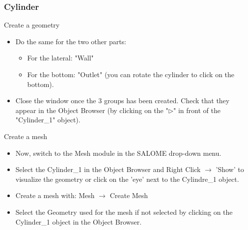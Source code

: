 \documentclass[10pt, hyperref={unicode=true,pdfusetitle, bookmarks=true,bookmarksnumbered=false,bookmarksopen=false, breaklinks=false,pdfborder={0 0l 1},backref=true,colorlinks=true,linkcolor=darkblue,pageanchor}]{beamer}
\begin{document}
\begin{frame}
\frametitle{Cylinder}

\begin{block}{Create a geometry}
\begin{itemize}
\item Do the same for the two other parts:
    \begin{itemize}
    \item [$\circ$] For the lateral: "Wall"
    \item [$\circ$] For the bottom: "Outlet" (you can rotate the cylinder to click on the bottom).
    \end{itemize}
\item Close the window once the 3 groups has been created. Check that they appear in the Object Browser (by clicking on the "$\triangleright$" in front of the "Cylinder\_1" object).
\end{itemize}
\end{block}

\begin{block}{Create a mesh}
\begin{itemize}
\item \label{salome_mesh} Now, switch to the Mesh module in the SALOME drop-down menu.
\item Select the Cylinder\_1 in the Object Browser and Right Click $\rightarrow$ 'Show' to visualize the geometry or click on the 'eye' next to the Cylindre\_1 object.
\item Create a mesh with: Mesh $\rightarrow$ Create Mesh
\item Select the Geometry used for the mesh if not selected by clicking on the Cylinder\_1 object in the Object Browser.
\end{itemize}
\end{block}

\end{frame}
\end{document}

